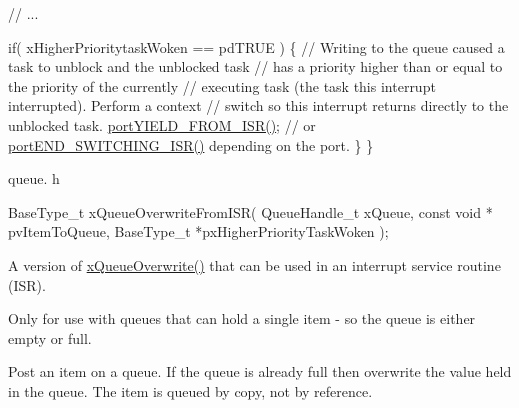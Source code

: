 \begin{DoxyPre} // ...\end{DoxyPre}



\begin{DoxyPre} if( xHigherPrioritytaskWoken == pdTRUE )
 \{
     // Writing to the queue caused a task to unblock and the unblocked task
     // has a priority higher than or equal to the priority of the currently
     // executing task (the task this interrupt interrupted).  Perform a context
     // switch so this interrupt returns directly to the unblocked task.
     \hyperlink{externals_2freertos_2portable_2_g_c_c_2_a_r_m___c_m0_2portmacro_8h_aac6850c66595efdc02a8bbb95fb4648e}{portYIELD\_FROM\_ISR()}; // or \hyperlink{externals_2freertos_2portable_2_g_c_c_2_a_r_m___c_m0_2portmacro_8h_a63b994040c62c9685490a71c87a13d8a}{portEND\_SWITCHING\_ISR()} depending on the port.
 \}
\}
\end{DoxyPre}


queue. h 
\begin{DoxyPre}
 BaseType\_t xQueueOverwriteFromISR(
                              QueueHandle\_t xQueue,
                              const void * pvItemToQueue,
                              BaseType\_t *pxHigherPriorityTaskWoken
                         );
   \end{DoxyPre}


A version of \hyperlink{vendor_2ceedling_2plugins_2freertos_2src_2freertos_2include_2queue_8h_a8e9ced123b5a0e37a36d3bbdb2e56b4e}{x\+Queue\+Overwrite()} that can be used in an interrupt service routine (I\+SR).

Only for use with queues that can hold a single item -\/ so the queue is either empty or full.

Post an item on a queue. If the queue is already full then overwrite the value held in the queue. The item is queued by copy, not by reference.


